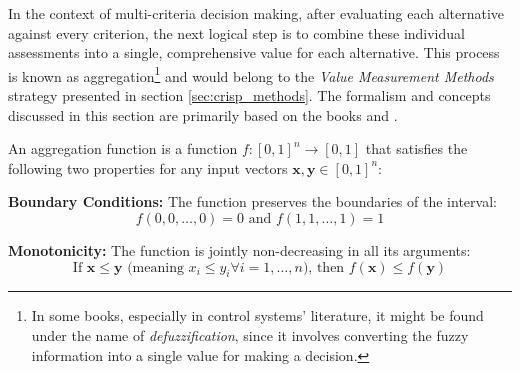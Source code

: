 \label{subsec:fuzzy_aggregation}









In the context of multi-criteria decision making, after evaluating each alternative against every criterion, the next logical step is to combine these individual assessments into a single, comprehensive value for each alternative. This process is known as aggregation\footnote{In some books, especially in control systems' literature, it might be found under the name of \textit{defuzzification}, since it involves converting the fuzzy information into a single value for making a decision.} and would belong to the \emph{Value Measurement Methods} strategy presented in section \ref{sec:crisp_methods}. The formalism and concepts discussed in this section are primarily based on the books \cite{beliakov2023discrete} and \cite{xu2015uncertain}.

\begin{definition} \label{def:aggregation_function}
An aggregation function is a function $f: [0, 1]^n \to [0, 1]$ that satisfies the following two properties for any input vectors $\mathbf{x}, \mathbf{y} \in [0, 1]^n$:
\begin{romanenum}
    \item \textbf{Boundary Conditions:} The function preserves the boundaries of the interval:
    \[f(0, 0, \dots, 0) = 0\text{ and }f(1, 1, \dots, 1) = 1\]
    \item \textbf{Monotonicity:} The function is jointly non-decreasing in all its arguments:
    \[\text{If }\mathbf{x} \le \mathbf{y}\text{ (meaning }x_i \le y_i \forall i=1, \dots, n\text{), then }f(\mathbf{x}) \le f(\mathbf{y})\]
\end{romanenum}
\end{definition}

